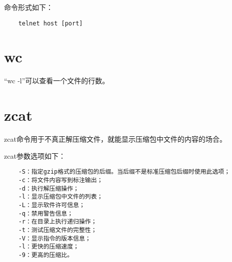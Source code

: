 \documentclass[a4paper,left=2.5cm,right=2.5cm,11pt]{article}
\begin{document}
	命令形式如下：
	\begin{lstlisting}
	telnet host [port]
	\end{lstlisting}

\section{wc}
	“wc -l”可以查看一个文件的行数。

\section{zcat}
	zcat命令用于不真正解压缩文件，就能显示压缩包中文件的内容的场合。\par

	zcat参数选项如下：
	\begin{lstlisting}
	-S：指定gzip格式的压缩包的后缀。当后缀不是标准压缩包后缀时使用此选项； 
	-c：将文件内容写到标注输出； 
	-d：执行解压缩操作； 
	-l：显示压缩包中文件的列表； 
	-L：显示软件许可信息； 
	-q：禁用警告信息； 
	-r：在目录上执行递归操作； 
	-t：测试压缩文件的完整性； 
	-V：显示指令的版本信息； 
	-l：更快的压缩速度； 
	-9：更高的压缩比。
	\end{lstlisting}
\end{document}
